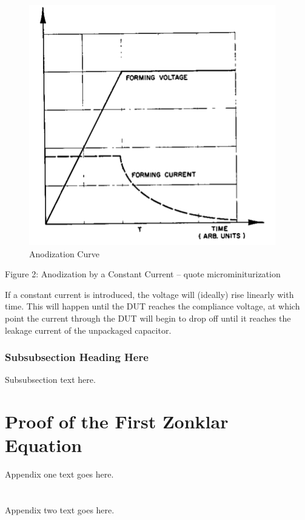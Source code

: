 \documentclass[journal]{./IEEEtran}
\begin{document}
\begin{figure}[here]
\centering
\includegraphics{anodCurve}
\caption{Anodization Curve}
\label{fig:anodCurve}
\end{figure}
Figure 2: Anodization by a Constant Current – quote microminiturization

If a constant current is introduced, the voltage will (ideally) rise linearly with time. This will happen until the DUT reaches the compliance voltage, at which point the current through the DUT will begin to drop off until it reaches the leakage current of the unpackaged capacitor. 



\subsubsection{Subsubsection Heading Here}
Subsubsection text here.


\appendices
\section{Proof of the First Zonklar Equation}
Appendix one text goes here.

\section{}
Appendix two text goes here.
\end{document}
